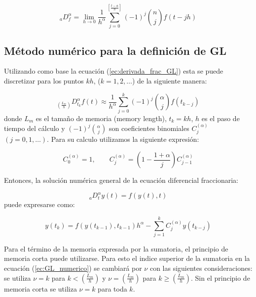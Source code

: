 	\begin{equation}
		_{a}D_{f}^{\alpha} = \lim_{h \to 0 } \frac{1}{h^{\alpha}} \sum_{j = 0}^{\left[ \frac{t-a}{h}  \right]} (-1)^{j} \binom{n}{j} f(t - jh)
	\end{equation}

		\subsection{Método numérico para la definición de GL}
		
	Utilizando como base la ecuación (\ref{ec:derivada_frac_GL}) esta se puede discretizar para los puntos $kh$, ($k = 1,2,\ldots$) de la siguiente manera:
			
	\begin{equation}
		_{\left( \frac{L_{m}}{h} \right)} D^{\alpha}_{t_{k}} f(t) \approx \frac{1}{h^{\alpha}} \sum_{j=0}^{k}(-1)^{j}  \binom{\alpha}{j} f(t_{k-j})
	\end{equation}
	donde $L_{m}$ es el tamaño de memoria (memory length), $t_{k} = kh$, $h$ es el paso de tiempo del cálculo y $(-1)^{j}\binom{\alpha}{j}$ son coeficientes binomiales $C_{j}^{(\alpha)}$ $(j=0,1,\ldots)$. Para su calculo utilizamos la siguiente expresión:
		
	\begin{equation}
		C_{0}^{(\alpha)} = 1, \qquad  C_{j}^{(\alpha)} = \left( 1 - \frac{1 + \alpha}{j} \right) C_{j-1}^{(\alpha)}
	\end{equation}
			
	Entonces, la solución numérica general de la ecuación diferencial fraccionaria:
		
	\begin{equation}
	 	_{a}D^{\alpha}_{t} y(t) = f(y(t), t)
	\end{equation}
	puede expresarse como:
		
	\begin{equation}
		y(t_{k}) = f(y(t_{k-1}), t_{k-1}) h^{\alpha} - \sum_{j=1}^{k} C_{j}^{(\alpha)} y(t_{k-j})
		\label{ec:GL_numerico}
	\end{equation}

	Para el término de la memoria expresada por la sumatoria, el principio de memoria corta puede utilizarse. Para esto el indice superior de la sumatoria en la ecuación (\ref{ec:GL_numerico}) se cambiará por $\nu$ con las siguientes consideraciones: se utiliza $\nu = k$ para $k < \left( \frac{L_{m}}{h} \right)$ y $\nu = \left( \frac{L_{m}}{h} \right)$ para $k \geq (\frac{L_{m}}{h})$. Sin el principio de memoria corta se utiliza $\nu = k$ para toda $k$. 
	
